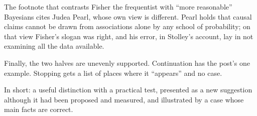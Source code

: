\begin{afterword}
The footnote that contrasts Fisher the frequentist with ``more reasonable'' Bayesians cites Judea Pearl, whose own view is different. Pearl holds that causal claims cannot be drawn from associations alone by any school of probability; on that view Fisher's slogan was right, and his error, in Stolley's account, lay in not examining all the data available.

Finally, the two halves are unevenly supported. Continuation has the post's one example. Stopping gets a list of places where it ``appears'' and no case.

In short: a useful distinction with a practical test, presented as a new suggestion although it had been proposed and measured, and illustrated by a case whose main facts are correct.
\end{afterword}

